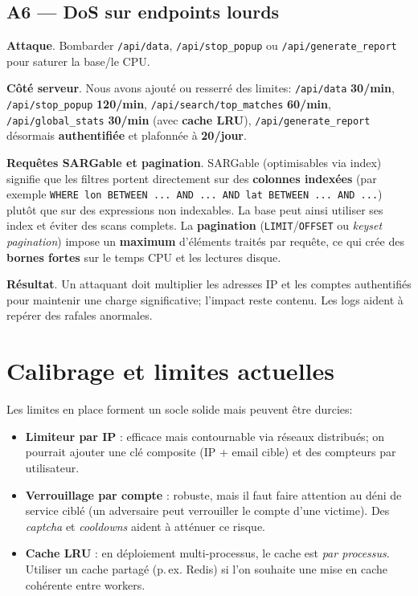 \subsection*{A6 — DoS sur endpoints lourds}
\textbf{Attaque}. Bombarder \texttt{/api/data}, \texttt{/api/stop\_popup} ou \texttt{/api/generate\_report} pour saturer la base/le CPU.

\textbf{Côté serveur}. Nous avons ajouté ou resserré des limites: \texttt{/api/data} \textbf{30/min}, \texttt{/api/stop\_popup} \textbf{120/min}, \texttt{/api/search/top\_matches} \textbf{60/min}, \texttt{/api/global\_stats} \textbf{30/min} (avec \textbf{cache LRU}), \texttt{/api/generate\_report} désormais \textbf{authentifiée} et plafonnée à \textbf{20/jour}.

\noindent \textbf{Requêtes SARGable et pagination}. \og SARGable \fg{} (optimisables via index) signifie que les filtres portent directement sur des \textbf{colonnes indexées} (par exemple \texttt{WHERE lon BETWEEN ... AND ... AND lat BETWEEN ... AND ...}) plutôt que sur des expressions non indexables. La base peut ainsi utiliser ses index et éviter des scans complets. La \textbf{pagination} (\texttt{LIMIT}/\texttt{OFFSET} ou \emph{keyset pagination}) impose un \textbf{maximum} d'éléments traités par requête, ce qui crée des \textbf{bornes fortes} sur le temps CPU et les lectures disque.

\textbf{Résultat}. Un attaquant doit multiplier les adresses IP et les comptes authentifiés pour maintenir une charge significative; l'impact reste contenu. Les logs aident à repérer des rafales anormales.

\section{Calibrage et limites actuelles}
\noindent Les limites en place forment un socle solide mais peuvent être durcies:
\begin{itemize}
  \item \textbf{Limiteur par IP} : efficace mais contournable via réseaux distribués; on pourrait ajouter une clé composite (IP + email cible) et des compteurs par utilisateur.
  \item \textbf{Verrouillage par compte} : robuste, mais il faut faire attention au déni de service ciblé (un adversaire peut \og verrouiller \fg{} le compte d'une victime). Des \emph{captcha} et \emph{cooldowns} aident à atténuer ce risque.
  \item \textbf{Cache LRU} : en déploiement multi-processus, le cache est \emph{par processus}. Utiliser un cache partagé (p.\,ex. Redis) si l'on souhaite une mise en cache cohérente entre workers.
\end{itemize}


